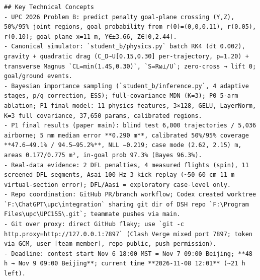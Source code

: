 \documentclass[UTF8,10pt]{ctexart}
\begin{document}
\begin{Verbatim}[breaklines=true,breakanywhere=true,fontsize=\scriptsize,frame=single,framesep=2pt]
## Key Technical Concepts
- UPC 2026 Problem B: predict penalty goal-plane crossing (Y,Z), 50%/95% joint regions, goal probability from r(0)=(0,0,0.11), r(0.05), r(0.10); goal plane x=11 m, Y∈±3.66, Z∈[0,2.44].
- Canonical simulator: `student_b/physics.py` batch RK4 (dt 0.002), gravity + quadratic drag (C_D~U[0.15,0.30] per-trajectory, ρ=1.20) + transverse Magnus `CL=min(1.4S,0.30)`, `S=Rω⊥/U`; zero-cross → lift 0; goal/ground events.
- Bayesian importance sampling (`student_b/inference.py`, 4 adaptive stages, p/q correction, ESS); full-covariance MDN (K=3); P0 5-arm ablation; P1 final model: 11 physics features, 3×128, GELU, LayerNorm, K=3 full covariance, 37,650 params, calibrated regions.
- P1 final results (paper main): blind test 6,000 trajectories / 5,036 airborne; 5 mm median error **0.290 m**, calibrated 50%/95% coverage **47.6–49.1% / 94.5–95.2%**, NLL −0.219; case mode (2.62, 2.15) m, areas 0.177/0.775 m², in-goal prob 97.3% (Bayes 96.3%).
- Real-data evidence: 2 DFL penalties, 4 measured flights (spin), 11 screened DFL segments, Asai 100 Hz 3-kick replay (~50–60 cm 11 m virtual-section error); DFL/Aasi = exploratory case-level only.
- Repo coordination: GitHub PR/branch workflow; Codex created worktree `F:\ChatGPT\upc\integration` sharing git dir of DSH repo `F:\Program Files\upc\UPC155\.git`; teammate pushes via main.
- Git over proxy: direct GitHub flaky; use `git -c http.proxy=http://127.0.0.1:7897` (Clash Verge mixed port 7897; token via GCM, user [team member], repo public, push permission).
- Deadline: contest start Nov 6 18:00 MST = Nov 7 09:00 Beijing; **48 h → Nov 9 09:00 Beijing**; current time **2026-11-08 12:01** (~21 h left).


\end{Verbatim}
\end{document}
